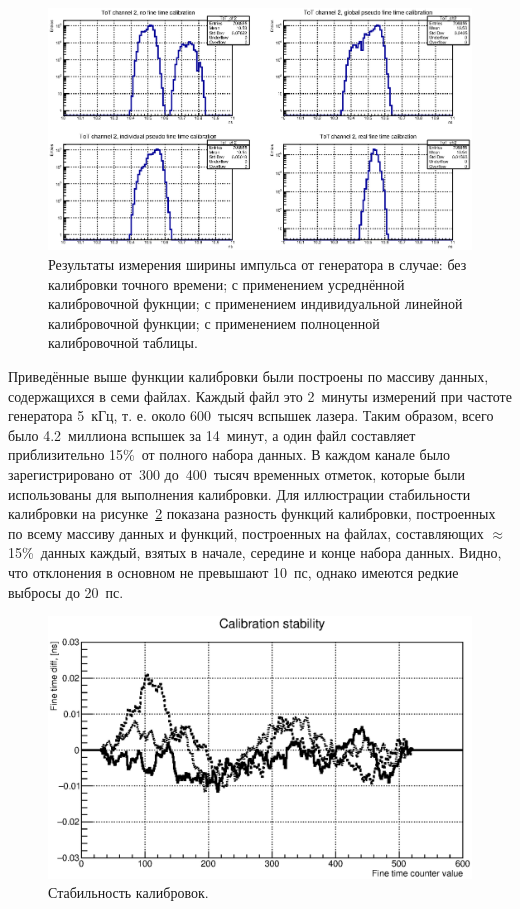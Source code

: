\begin{figure}
\includegraphics[width=1.0\textwidth]{pictures/ToT_ch2.eps}
\caption{Результаты измерения ширины импульса от генератора в случае: без калибровки точного времени; с применением усреднённой калибровочной фукнции; с применением индивидуальной линейной калибровочной функции; с применением полноценной калибровочной таблицы.}
\label{fig:FourToT}
\end{figure}

Приведённые выше функции калибровки были построены по массиву данных, содержащихся в семи файлах. Каждый файл это 2~минуты измерений при частоте генератора 5~кГц, т. е. около 600~тысяч вспышек лазера. Таким образом, всего было 4.2~миллиона вспышек за  14~минут, а один файл составляет приблизительно 15\%~от полного набора данных. В каждом канале было зарегистрировано от~300 до~400~тысяч временных отметок, которые были использованы для выполнения калибровки. Для иллюстрации стабильности калибровки на рисунке~\ref{fig:Stability} показана разность функций калибровки, построенных по всему массиву данных и функций, построенных на файлах, составляющих $ \approx $15\%~данных каждый, взятых в начале, середине и конце набора данных. Видно, что отклонения в основном не превышают 10~пс, однако имеются редкие выбросы до 20~пс.

\begin{figure}
\includegraphics[width=1.0\textwidth]{pictures/calibrationStability_dec2016.eps}
\caption{Стабильность калибровок.}
\label{fig:Stability}
\end{figure}
